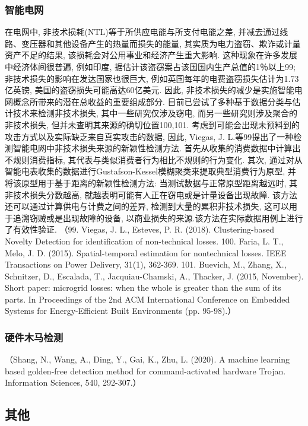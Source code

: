 \documentclass{Style/aas}
\begin{document}
\begin{multicols}{2}
\subsubsection{智能电网}
在电网中, 非技术损耗(NTL)等于所供应电能与所支付电能之差, 并减去通过线路、变压器和其他设备产生的热量而损失的能量, 其实质为电力盗窃、欺诈或计量资产不足的结果, 该损耗会对公用事业和经济产生重大影响. 这种现象在许多发展中经济体间很普遍, 例如印度, 据估计该盗窃案占该国国内生产总值的1％以上99; 非技术损失的影响在发达国家也很巨大, 例如英国每年的电费盗窃损失估计为1.73亿英镑, 美国的盗窃损失可能高达60亿美元. 因此, 非技术损失的减少是实施智能电网概念所带来的潜在总收益的重要组成部分. 
目前已尝试了多种基于数据分类与估计技术来检测非技术损失, 其中一些研究仅涉及窃电, 而另一些研究则涉及聚合的非技术损失, 但并未查明其来源的确切位置100,101. 考虑到可能会出现未预料到的攻击方式以及实际缺乏来自真实攻击的数据, 因此, Viegas, J. L.等99提出了一种检测智能电网中非技术损失来源的新颖性检测方法. 首先从收集的消费数据中计算出不规则消费指标, 其代表与类似消费者行为相比不规则的行为变化. 其次, 通过对从智能电表收集的数据进行Gustafson-Kessel模糊聚类来提取典型消费行为原型, 并将该原型用于基于距离的新颖性检测方法: 当测试数据与正常原型距离越远时, 其非技术损失分数越高, 就越表明可能有人正在窃电或是计量设备出现故障. 该方法还可以通过计算供电与计费之间的差异, 检测到大量的累积非技术损失, 这可以用于追溯窃贼或是出现故障的设备, 以商业损失的来源.该方法在实际数据用例上进行了有效性验证.
（99.	Viegas, J. L., Esteves, P. R. (2018). Clustering-based Novelty Detection for identification of non-technical losses. 
100.	Faria, L. T., Melo, J. D. (2015). Spatial-temporal estimation for nontechnical losses. IEEE Transactions on Power Delivery, 31(1), 362-369.
101.	Buevich, M., Zhang, X., Schnitzer, D., Escalada, T., Jacquiau-Chamski, A., Thacker, J. (2015, November). Short paper: microgrid losses: when the whole is greater than the sum of its parts. In Proceedings of the 2nd ACM International Conference on Embedded Systems for Energy-Efficient Built Environments (pp. 95-98).）


\subsubsection{硬件木马检测}
（Shang, N., Wang, A., Ding, Y., Gai, K., Zhu, L. (2020). A machine learning based golden-free detection method for command-activated hardware Trojan. Information Sciences, 540, 292-307.）


\subsection{其他}

\end{multicols}
\end{document}
